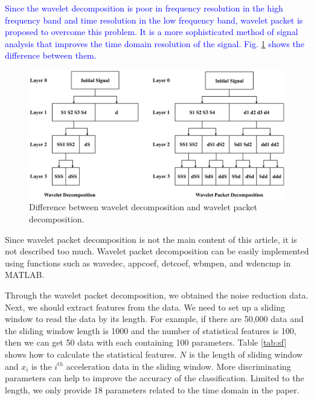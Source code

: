 \documentclass{modified}
\begin{document}
\textcolor{blue}{Since the wavelet decomposition \cite{Walczak1997Noise} is poor in frequency resolution in the high frequency band and time resolution in the low frequency band, wavelet packet is proposed to overcome this problem. It is a more sophisticated method of signal analysis that improves the time domain resolution of the signal. Fig. \ref{fig:wpd} shows the difference between them.}

\begin{figure}[htbp]
	\centering
	\includegraphics[width=\columnwidth]{wpd.eps}
	\caption{Difference between wavelet decomposition and wavelet packet decomposition.}
	\label{fig:wpd}
\end{figure}

Since wavelet packet decomposition is not the main content of this article, it is not described too much. Wavelet packet decomposition can be easily implemented using functions such as wavedec, appcoef, detcoef, wbmpen, and wdencmp in MATLAB.

Through the wavelet packet decomposition, we obtained the noise reduction data. Next, we should extract features from the data. We need to set up a sliding window to read the data by its length. For example, if there are 50,000 data and the sliding window length is 1000 and the number of statistical features is 100, then we can get 50 data with each containing 100 parameters. Table \ref{tab:sf} shows how to calculate the statistical features. $N$ is the length of sliding window and $x_i$ is the $i^{th}$ acceleration data in the sliding window. More discriminating parameters can help to improve the accuracy of the classification. Limited to the length, we only provide 18 parameters related to the time domain in the paper.
\end{document}
